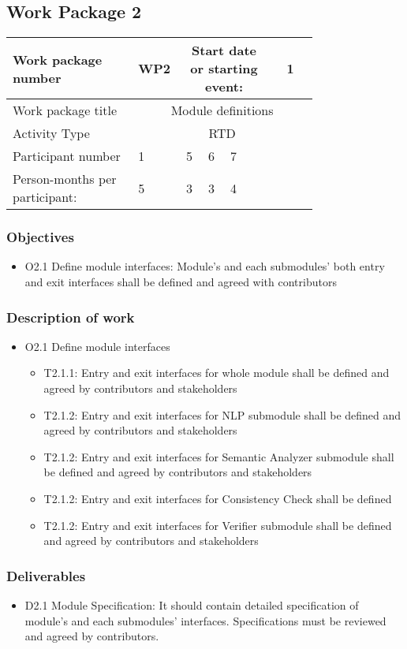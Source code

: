 \subsection{Work Package 2}

\begin{table}[hbpt]\centering
	\begin{tabular}{|p{0.35\linewidth}|p{0.06\linewidth}|p{0.06\linewidth}|p{0.06\linewidth}|
         p{0.06\linewidth}|p{0.06\linewidth}|p{0.06\linewidth}|p{0.06\linewidth}|}\hline
		 Work package number& WP2 &
		 \multicolumn{4}{|c|}{Start date or starting event:}{}&
		 \multicolumn{2}{|c|}{                        1 }{}\\\hline
		 Work package title&\multicolumn{7}{|c|}{Module definitions}{}\\\hline
		 Activity Type&\multicolumn{7}{|c|}{ RTD }{}\\\hline
		 Participant number & 1 & 5 & 6 & 7 & ~ & ~ & ~ \\\hline
		 Person-months per participant: & 5 & 3 & 3 & 4 & ~ & ~ & ~ \\\hline
	\end{tabular}
\end{table}

\subsubsection{Objectives}
\begin{itemize}
	\item O2.1 Define module interfaces: Module's and each submodules' both entry and exit interfaces shall be defined and agreed with contributors
\end{itemize}

\subsubsection{Description of work}
\begin{itemize}
	\item O2.1 Define module interfaces
	\begin{itemize}
		\item T2.1.1: Entry and exit interfaces for whole module shall be defined and agreed by contributors and stakeholders
		\item T2.1.2:  Entry and exit interfaces for \gls{NLP} submodule shall be defined and agreed by contributors and stakeholders
		\item T2.1.2:  Entry and exit interfaces for Semantic Analyzer submodule shall be defined and agreed by contributors and stakeholders
		\item T2.1.2:  Entry and exit interfaces for Consistency Check shall be defined
		\item T2.1.2:  Entry and exit interfaces for Verifier submodule shall be defined and agreed by contributors and stakeholders
	\end{itemize}
\end{itemize}

\subsubsection{Deliverables}
	\begin{itemize}
		\item D2.1 Module Specification: It should contain detailed specification of module's and each submodules' interfaces. Specifications must be reviewed and agreed by contributors.
	\end{itemize}